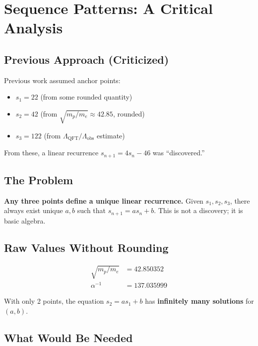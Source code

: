 \documentclass[11pt,a4paper]{article}
\begin{document}
\section{Sequence Patterns: A Critical Analysis}

\subsection{Previous Approach (Criticized)}

Previous work assumed anchor points:
\begin{itemize}
    \item $s_1 = 22$ (from some rounded quantity)
    \item $s_2 = 42$ (from $\sqrt{m_p/m_e} \approx 42.85$, rounded)
    \item $s_3 = 122$ (from $\Lambda_{\text{QFT}}/\Lambda_{\text{obs}}$ estimate)
\end{itemize}

From these, a linear recurrence $s_{n+1} = 4s_n - 46$ was ``discovered.''

\subsection{The Problem}

\textbf{Any three points define a unique linear recurrence.} Given $s_1, s_2, s_3$, there always exist unique $a, b$ such that $s_{n+1} = as_n + b$. This is not a discovery; it is basic algebra.

\subsection{Raw Values Without Rounding}

\begin{align}
\sqrt{m_p/m_e} &= 42.850352 \\
\alpha^{-1} &= 137.035999
\end{align}

With only 2 points, the equation $s_2 = as_1 + b$ has \textbf{infinitely many solutions} for $(a, b)$.

\subsection{What Would Be Needed}
\end{document}
